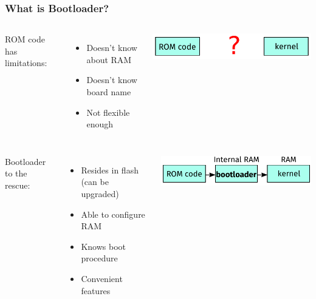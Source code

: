 \documentclass[aspectratio=169]{beamer}
\begin{document}
\begin{frame}
  \frametitle{What is Bootloader?}
  \begin{columns}
      ROM code has limitations:
      \begin{itemize}
      \item Doesn't know about RAM
      \item Doesn't know board name
      \item Not flexible enough
      \end{itemize}
      \includegraphics[scale=0.85]{images/bootloader1.pdf}
  \end{columns}
  \pause
  \bigskip
  \begin{columns}
      Bootloader to the rescue:
      \begin{itemize}
      \item Resides in flash (can be upgraded)
      \item Able to configure RAM
      \item Knows boot procedure
      \item Convenient features
      \end{itemize}
      \includegraphics[scale=0.85]{images/bootloader2.pdf}
  \end{columns}
\end{frame}
\end{document}
